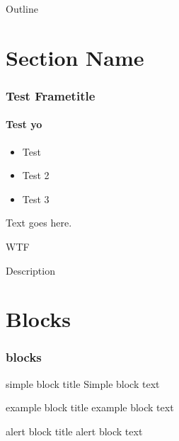 \begin{frame}{}
	\titlepage
\end{frame}


\begin{frame}{Outline}\label{tableofcontents}
   \tableofcontents
\end{frame}






\section{Section Name}

\begin{frame}
	\frametitle{Test Frametitle}
	\framesubtitle{Test yo}

    \begin{itemize}
		\item Test
		\item Test 2
		\item Test 3
    \end{itemize}

    \begin{description}
		\item[${G_3}'$:] Text goes here.
		\item WTF
		\item [Item Name] Description
    \end{description}
\end{frame}









\section{Blocks}


\begin{frame}
	\frametitle{blocks}

    \begin{block}{simple block title}
        Simple block text
    \end{block}
    
    \begin{exampleblock}{example block title}
         example block text
    \end{exampleblock}
   
    \begin{alertblock}{alert block title}
         alert block text
    \end{alertblock}
    
\end{frame}












